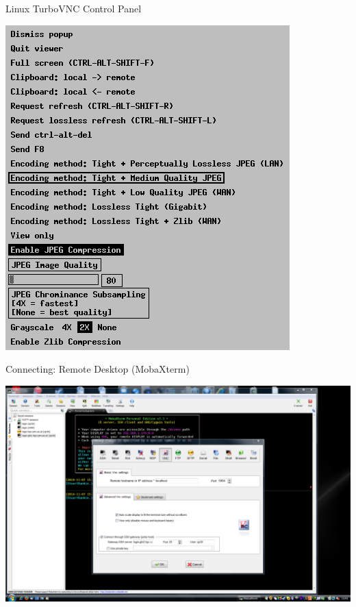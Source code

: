 \begin{frame}{Linux TurboVNC Control Panel}
\begin{center}
\centerline{\includegraphics[height=0.8\textheight]{imgs/linux-turbovnc-F8.png}}
\end{center}
\end{frame}

\begin{frame}{Connecting: Remote Desktop (MobaXterm)}
\begin{center}
\centerline{\includegraphics[height=0.8\textheight]{imgs/mobaxterm-turbovnc.png}}
\end{center}
\end{frame}

